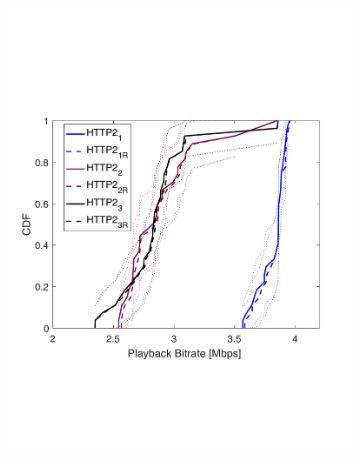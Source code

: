\begin{figure}[t!]
\centering
\begin{subfigure}[t]{0.33\textwidth}
   \captionsetup{justification=centering,margin=4.5cm}
    \includegraphics[trim={0 6cm 0 7cm}, scale=0.246]{figures/CDF_bitrat_squad_parallel_quic_nd18.pdf}
     \caption{}
    \label{fig:pquicbitrate}
  \end{subfigure}
  \begin{subfigure}[t]{0.33\textwidth}
  \captionsetup{justification=raggedright,singlelinecheck=false,margin=2.5cm}

\end{subfigure}
\end{figure}
